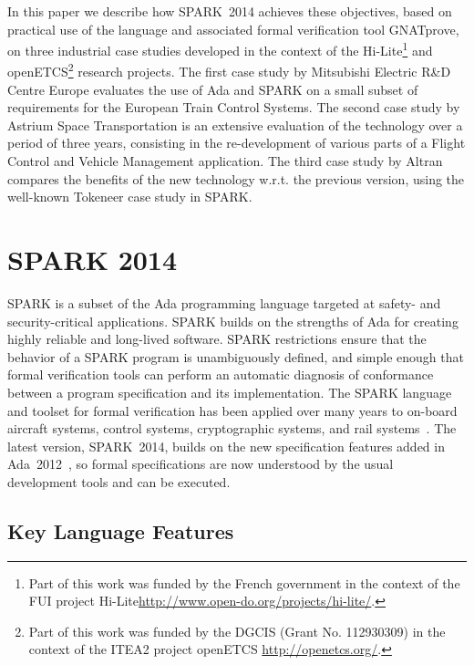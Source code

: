 \documentclass[10pt,a4paper,twocolumn]{article}
\newcommand{\hilite}{Hi-Lite\xspace}
\newcommand{\openetcs}{openETCS\xspace}
\newcommand{\gnatprove}{GNATprove\xspace}
\newcommand{\newspark}{SPARK~2014\xspace}
\newcommand{\adatwtw}{Ada~2012\xspace}
\newcommand{\wrt}{w.r.t.\xspace}
\begin{document}
In this paper we describe how \newspark achieves these objectives,
based on practical use of the language and associated formal
verification tool \gnatprove, on three industrial case studies
developed in the context of the \hilite\footnote{Part of this work was
  funded by the French government in the context of the FUI project
  \hilite\url{http://www.open-do.org/projects/hi-lite/}.} and
\openetcs\footnote{Part of this work was funded by the DGCIS (Grant
  No. 112930309) in the context of the ITEA2 project \openetcs
  \url{http://openetcs.org/}.} research projects. The first case study
by Mitsubishi Electric R\&D Centre Europe evaluates the use of Ada and
SPARK on a small subset of requirements for the European Train Control
Systems. The second case study by Astrium Space Transportation is an
extensive evaluation of the technology over a period of three years,
consisting in the re-development of various parts of a Flight Control
and Vehicle Management application. The third case study by Altran
compares the benefits of the new technology \wrt the previous version,
using the well-known Tokeneer case study in SPARK.

\section{SPARK 2014}


SPARK is a subset of the Ada programming language targeted at safety-
and security-critical applications. SPARK builds on the strengths of
Ada for creating highly reliable and long-lived software. SPARK
restrictions ensure that the behavior of a SPARK program is
unambiguously defined, and simple enough that formal verification
tools can perform an automatic diagnosis of conformance between a
program specification and its implementation. The SPARK language and
toolset for formal verification has been applied over many years to
on-board aircraft systems, control systems, cryptographic systems, and
rail systems~\cite{sparkbook2012,oneill2012}. The latest version,
\newspark, builds on the new specification features added in
\adatwtw~\cite{ada2012rationale}, so formal specifications are now
understood by the usual development tools and can be executed.

\subsection{Key Language Features}
\end{document}
